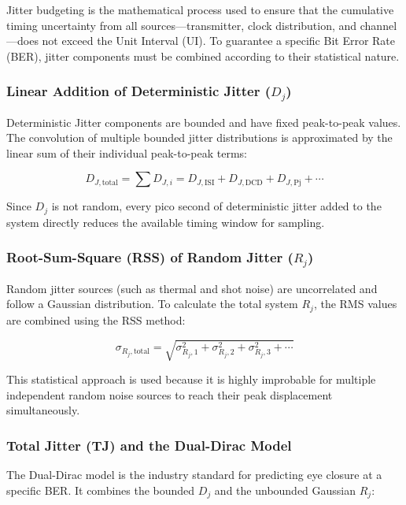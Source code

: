 \documentclass[12pt, a4paper]{report}
\renewcommand{\DJ}{D_j}
\newcommand{\RJ}{R_j}
\begin{document}
Jitter budgeting is the mathematical process used to ensure that the cumulative timing uncertainty from all sources—transmitter, clock distribution, and channel—does not exceed the Unit Interval (UI). To guarantee a specific Bit Error Rate (BER), jitter components must be combined according to their statistical nature.

\subsubsection{Linear Addition of Deterministic Jitter (\(\DJ\))}
Deterministic Jitter components are bounded and have fixed peak-to-peak values. The convolution of multiple bounded jitter distributions is approximated by the linear sum of their individual peak-to-peak terms:

\begin{equation}
    D_{J,\text{total}} = \sum D_{J,i} = D_{J,\text{ISI}} + D_{J,\text{DCD}} + D_{J,\text{Pj}} + \cdots
\end{equation}

Since \(\DJ\) is not random, every pico second of deterministic jitter added to the system directly reduces the available timing window for sampling.

\subsubsection{Root-Sum-Square (RSS) of Random Jitter (\(\RJ\))}
Random jitter sources (such as thermal and shot noise) are uncorrelated and follow a Gaussian distribution. To calculate the total system \(\RJ\), the RMS values are combined using the RSS method:

\begin{equation}
    \sigma_{\RJ,\text{total}} = \sqrt{\sigma_{\RJ,1}^2 + \sigma_{\RJ,2}^2 + \sigma_{\RJ,3}^2 + \cdots}
\end{equation}

This statistical approach is used because it is highly improbable for multiple independent random noise sources to reach their peak displacement simultaneously.

\subsubsection{Total Jitter (TJ) and the Dual-Dirac Model}
The Dual-Dirac model is the industry standard for predicting eye closure at a specific BER. It combines the bounded \(\DJ\) and the unbounded Gaussian \(\RJ\):
\end{document}
